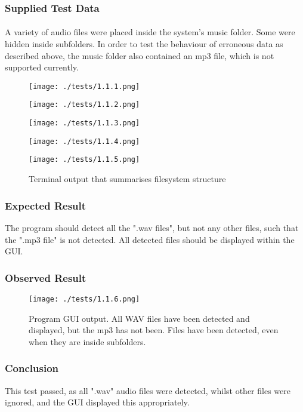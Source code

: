 \subsubsection*{Supplied Test Data}
\paragraph{}
A variety of audio files were placed inside the system's music folder. Some were hidden inside subfolders. In order to test the behaviour of erroneous data as described above, the music folder also contained an mp3 file, which is not supported currently.

\begin{figure}[H]
	\texttt{[image: ./tests/1.1.1.png]}
\end{figure}
\begin{figure}[H]
	\texttt{[image: ./tests/1.1.2.png]}
\end{figure}
\begin{figure}[H]
	\texttt{[image: ./tests/1.1.3.png]}
\end{figure}
\begin{figure}[H]
	\texttt{[image: ./tests/1.1.4.png]}
\end{figure}
\begin{figure}[H]
	\texttt{[image: ./tests/1.1.5.png]}
	\caption{Terminal output that summarises filesystem structure}
\end{figure}

\subsubsection*{Expected Result}
The program should detect all the ".wav files", but not any other files, such that the ".mp3 file" is not detected. All detected files should be displayed within the GUI.

\subsubsection*{Observed Result}
\label{sec:evidence1.1}
\begin{figure}[H]
	\texttt{[image: ./tests/1.1.6.png]}
	\caption{Program GUI output. All WAV files have been detected and displayed, but the mp3 has not been. Files have been detected, even when they are inside subfolders.}
\end{figure}

\subsubsection*{Conclusion}
This test passed, as all ".wav" audio files were detected, whilst other files were ignored, and the GUI displayed this appropriately.


